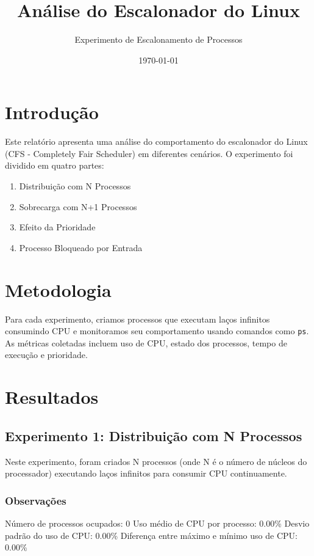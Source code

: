\documentclass{article}
\title{Análise do Escalonador do Linux}
\author{Experimento de Escalonamento de Processos}
\date{\today}
\begin{document}
\maketitle

\section{Introdução}

Este relatório apresenta uma análise do comportamento do escalonador do Linux (CFS - Completely Fair Scheduler) em diferentes cenários. 
O experimento foi dividido em quatro partes:

\begin{enumerate}
    \item Distribuição com N Processos
    \item Sobrecarga com N+1 Processos
    \item Efeito da Prioridade
    \item Processo Bloqueado por Entrada
\end{enumerate}

\section{Metodologia}

Para cada experimento, criamos processos que executam laços infinitos consumindo CPU e monitoramos seu comportamento 
usando comandos como \texttt{ps}. As métricas coletadas incluem uso de CPU, estado dos processos, tempo de execução e prioridade.

\section{Resultados}\subsection{Experimento 1: Distribuição com N Processos}
Neste experimento, foram criados N processos (onde N é o número de núcleos do processador) 
executando laços infinitos para consumir CPU continuamente.

\subsubsection{Observações}

Número de processos ocupados: 0
Uso médio de CPU por processo: 0.00\%
Desvio padrão do uso de CPU: 0.00\%
Diferença entre máximo e mínimo uso de CPU: 0.00\%
\end{document}
